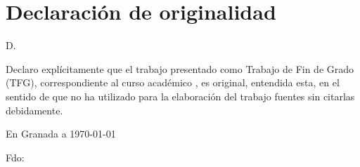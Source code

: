%
\thispagestyle{empty}

\hfill\vfill

\chapter*{Declaración de originalidad}\bigskip

D. \miNombre \\\medskip

Declaro explícitamente que el trabajo presentado como Trabajo de Fin de Grado (TFG), correspondiente al curso académico \miCurso, es original, entendida esta, en el sentido de que no ha utilizado para la elaboración del trabajo fuentes sin citarlas debidamente.
\medskip

En Granada a \today 
\begin{flushleft} 
Fdo: \miNombre 

\end{flushleft}

\cleardoublepage
\endinput

